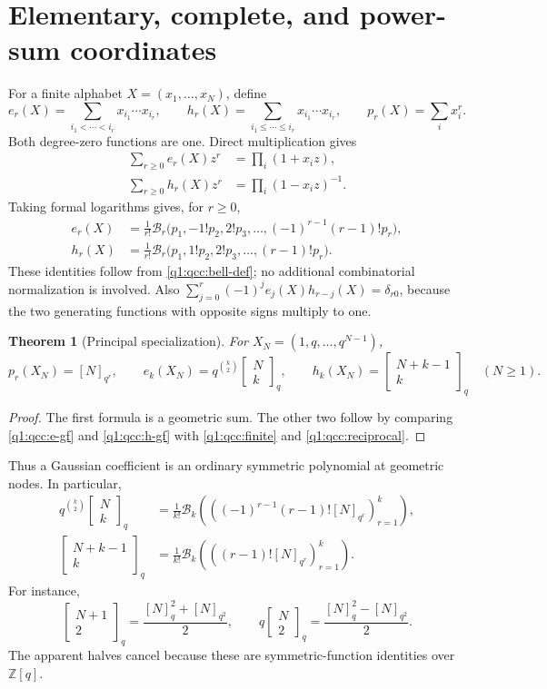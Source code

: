 \documentclass[11pt,a4paper,oneside,openany]{book}
\newtheorem{theorem}{Theorem}[chapter]
\theoremstyle{definition}
\theoremstyle{remark}
\newcommand{\Z}{\mathbb Z}
\newcommand{\GB}[3][q]{\begin{bmatrix}#2\\#3\end{bmatrix}_{#1}}
\newcommand{\qi}[2][q]{[#2]_{#1}}
\newcommand{\Y}[1]{\mathcal B_{#1}}
\begin{document}
\section{Elementary, complete, and power-sum coordinates}
For a finite alphabet \(X=(x_1,\ldots,x_N)\), define
\[
 e_r(X)=\sum_{i_1<\cdots<i_r}x_{i_1}\cdots x_{i_r},\qquad
 h_r(X)=\sum_{i_1\le\cdots\le i_r}x_{i_1}\cdots x_{i_r},
 \qquad p_r(X)=\sum_i x_i^r.
\]
Both degree-zero functions are one. Direct multiplication gives
\begin{align}
 \sum_{r\ge0}e_r(X)z^r&=\prod_i(1+x_i z),\label{q1:qcc:e-gf}\\
 \sum_{r\ge0}h_r(X)z^r&=\prod_i(1-x_i z)^{-1}.\label{q1:qcc:h-gf}
\end{align}
Taking formal logarithms gives, for \(r\ge0\),
\begin{align}
 e_r(X)&=\frac1{r!}\Y r\bigl(p_1,-1!p_2,2!p_3,\ldots,
                         (-1)^{r-1}(r-1)!p_r\bigr),\label{q1:qcc:e-bell}\\
 h_r(X)&=\frac1{r!}\Y r\bigl(p_1,1!p_2,2!p_3,\ldots,(r-1)!p_r\bigr).
 \label{q1:qcc:h-bell}
\end{align}
These identities follow from \eqref{q1:qcc:bell-def}; no additional combinatorial
normalization is involved. Also
\(\sum_{j=0}^r(-1)^j e_j(X)h_{r-j}(X)=\delta_{r0}\), because the two
generating functions with opposite signs multiply to one.

\begin{theorem}[Principal specialization]\label{q1:qcc:principal}
For \(X_N=(1,q,\ldots,q^{N-1})\),
\begin{equation}\label{q1:qcc:principal-formula}
 p_r(X_N)=\qi[q^r]N,\qquad
 e_k(X_N)=q^{\binom k2}\GB Nk,\qquad
 h_k(X_N)=\GB{N+k-1}k\quad(N\ge1).
\end{equation}
\end{theorem}
\begin{proof}
The first formula is a geometric sum. The other two follow by comparing
\eqref{q1:qcc:e-gf} and \eqref{q1:qcc:h-gf} with \eqref{q1:qcc:finite} and
\eqref{q1:qcc:reciprocal}.
\end{proof}
Thus a Gaussian coefficient is an ordinary symmetric polynomial at geometric
nodes. In particular,
\begin{align}
 q^{\binom k2}\GB Nk
 &=\frac1{k!}\Y k\left(\left((-1)^{r-1}(r-1)!\qi[q^r]N\right)_{r=1}^k\right),
 \label{q1:qcc:gaussian-e-bell}\\
 \GB{N+k-1}k
 &=\frac1{k!}\Y k\left(\left((r-1)!\qi[q^r]N\right)_{r=1}^k\right).
 \label{q1:qcc:gaussian-h-bell}
\end{align}
For instance,
\[
 \GB{N+1}2=\frac{\qi N^2+\qi[q^2]N}{2},\qquad
 q\GB N2=\frac{\qi N^2-\qi[q^2]N}{2}.
\]
The apparent halves cancel because these are symmetric-function identities over
\(\Z[q]\).
\end{document}
